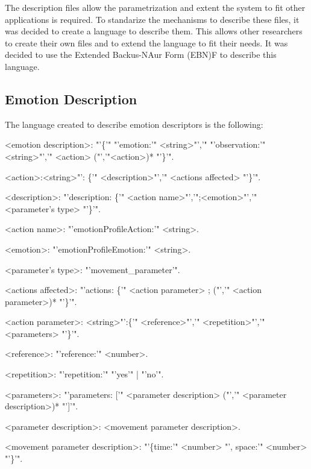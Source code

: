 The description files allow the parametrization and extent the system to fit other applications is required. To standarize the mechanisms to describe these files, it was decided to create a language to describe them. This allows other researchers to create their own files and to extend the language to fit their needs. It was decided to use the Extended Backus-NAur Form (EBN)F to describe this language.
\subsection{Emotion Description} 
The language created to describe emotion descriptors is the following:
\begin{small}

\begingrammar
%		
<emotion description>: "'\{'" "'emotion:'" <string>"','" "'observation:'" <string>"','" <action> ("','"<action>)* "'\}'".

<action>:<string>"': \{'" <description>"','" <actions affected> "'\}'".

<description>: "'description: \{'" <action name>"','";<emotion>"','" <parameter's type> "'\}'".

<action name>: "'emotionProfileAction:'" <string>.

<emotion>: "'emotionProfileEmotion:'" <string>.

<parameter's type>: "'movement\_parameter'".

<actions affected>: "'actions: \{'" <action parameter> ; ("','" <action parameter>)* "'\}'".

<action parameter>: <string>"':\{'" <reference>"','" <repetition>"','" <parameters> "'\}'".

<reference>: "'reference:'" <number>.

<repetition>: "'repetition:'" "'yes'" | "'no'".

<parameters>: "'parameters: ['" <parameter description> ("','" <parameter description>)* "']'".

<parameter description>: <movement parameter description>.

<movement parameter description>: "'\{time:'" <number> "', space:'" <number> "'\}'".

\endgrammar
\end{small}

